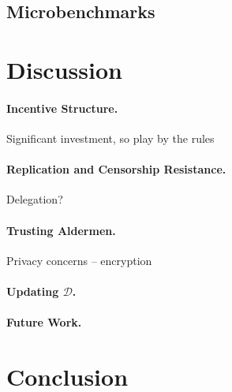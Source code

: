 \documentclass{article}
\begin{document}
\subsection{Microbenchmarks}

\section{Discussion}

\paragraph{Incentive Structure.} Significant investment, so play by the rules

\paragraph{Replication and Censorship Resistance.} Delegation?

\paragraph{Trusting Aldermen.} Privacy concerns -- encryption

\paragraph{Updating $\mathcal{D}$.}

\paragraph{Future Work.}

\section{Conclusion}









  

\end{document}
